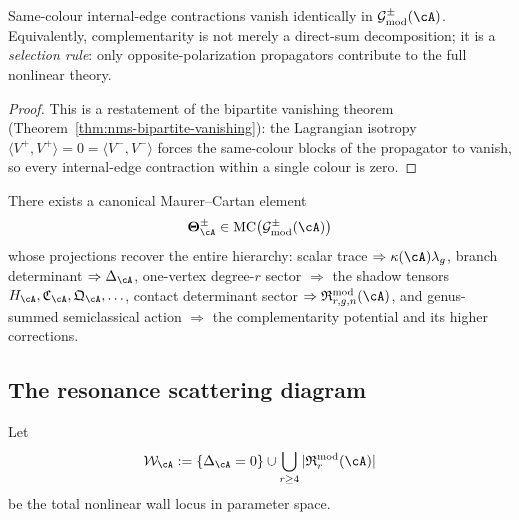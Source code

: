 \begin{theorem}
\label{thm:nms-bipartite-complementarity}
Same-colour internal-edge contractions vanish identically in $\mathcal G^{\pm}_{\mathrm{mod}}(\cA)$. Equivalently, complementarity is not merely a direct-sum decomposition; it is a \emph{selection rule}: only opposite-polarization propagators contribute to the full nonlinear theory.
\end{theorem}
\begin{proof}
This is a restatement of the bipartite vanishing theorem (Theorem~\ref{thm:nms-bipartite-vanishing}): the Lagrangian isotropy $\langle V^+,V^+\rangle=0=\langle V^-,V^-\rangle$ forces the same-colour blocks of the propagator to vanish, so every internal-edge contraction within a single colour is zero.
\end{proof}

\begin{conjecture}
\label{conj:nms-polarized-universal-class}
%
There exists a canonical Maurer--Cartan element
\[
\boldsymbol\Theta_{\cA}^{\pm}
\in
\mathrm{MC}\bigl(\mathcal G^{\pm}_{\mathrm{mod}}(\cA)\bigr)
\]
whose projections recover the entire hierarchy: scalar trace $\Rightarrow \kappa(\cA)\lambda_g$, branch determinant $\Rightarrow \Delta_{\cA}$, one-vertex degree-$r$ sector $\Rightarrow$ the shadow tensors $H_{\cA},\mathfrak C_{\cA},\mathfrak Q_{\cA},\ldots$, contact determinant sector $\Rightarrow \mathfrak R^{\mathrm{mod}}_{r,g,n}(\cA)$, and genus-summed semiclassical action $\Rightarrow$ the complementarity potential and its higher corrections.
\end{conjecture}

\subsection{The resonance scattering diagram}
\label{subsec:nms-resonance-scattering-diagram}

\begin{definition}
\label{def:nms-resonance-wall-locus}
Let
\[
\mathcal W_{\cA} := \{\Delta_{\cA}=0\}\cup \bigcup_{r\ge 4} |\mathfrak R^{\mathrm{mod}}_r(\cA)|
\]
be the total nonlinear wall locus in parameter space.
\end{definition}

